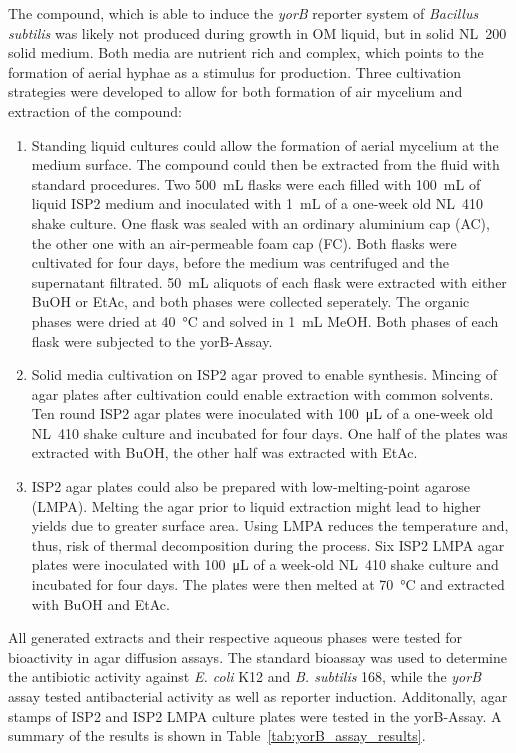 The compound, which is able to induce the \emph{yorB} reporter system of \emph{Bacillus subtilis} was likely not produced during growth in OM liquid, but in solid NL~200 solid medium.
Both media are nutrient rich and complex, which points to the formation of aerial hyphae as a stimulus for production.
Three cultivation strategies were developed to allow for both formation of air mycelium and extraction of the compound:

\begin{enumerate}
    \item
	    Standing liquid cultures could allow the formation of aerial mycelium at the medium surface.
	    The compound could then be extracted from the fluid with standard procedures.
	    Two \SI{500}{\milli\liter} flasks were each filled with \SI{100}{\milli\liter} of liquid ISP2 medium and inoculated with \SI{1}{\milli\liter} of a one-week old NL~410 shake culture.
	    One flask was sealed with an ordinary aluminium cap (AC), the other one with an air-permeable foam cap (FC).
	    Both flasks were cultivated for four days, before the medium was centrifuged and the supernatant filtrated.
	    \SI{50}{\milli\liter} aliquots of each flask were extracted with either BuOH or EtAc, and both phases were collected seperately.
	    The organic phases were dried at \SI{40}{\celsius} and solved in \SI{1}{\milli\liter} MeOH.
	    Both phases of each flask were subjected to the yorB-Assay.
    \item
		Solid media cultivation on ISP2 agar proved to enable synthesis.
		Mincing of agar plates after cultivation could enable extraction with common solvents.
		Ten round ISP2 agar plates were inoculated with \SI{100}{\micro\liter} of a one-week old NL~410 shake culture and incubated for four days.
		One half of the plates was extracted with BuOH, the other half was extracted with EtAc.
    \item
        ISP2 agar plates could also be prepared with low-melting-point agarose (LMPA).
        Melting the agar prior to liquid extraction might lead to higher yields due to greater surface area.
        Using LMPA reduces the temperature and, thus, risk of thermal decomposition during the process.
        Six ISP2 LMPA agar plates were inoculated with \SI{100}{\micro\liter} of a week-old NL~410 shake culture and incubated for four days.
        The plates were then melted at \SI{70}{\celsius} and extracted with BuOH and EtAc.
\end{enumerate}

All generated extracts and their respective aqueous phases were tested for bioactivity in agar diffusion assays.
The standard bioassay was used to determine the antibiotic activity against \textit{E. coli} K12 and \textit{B. subtilis} 168, while the \emph{yorB} assay tested antibacterial activity as well as reporter induction.
Additonally, agar stamps of ISP2 and ISP2 LMPA culture plates were tested in the yorB-Assay.
A summary of the results is shown in Table~\ref{tab:yorB_assay_results}.

